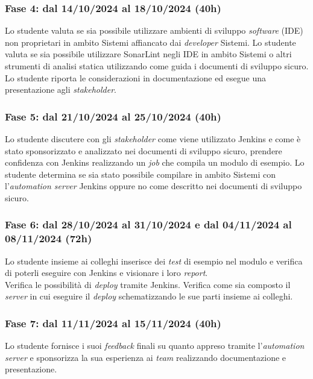 \subsubsection*{Fase 4: dal 14/10/2024 al 18/10/2024 (40h) }
Lo studente valuta se sia possibile utilizzare ambienti di sviluppo \emph{software} (\gls{IDE}) non proprietari in ambito \gls{Sistemi} affiancato dai \emph{developer} \gls{Sistemi}. Lo studente valuta se sia possibile utilizzare SonarLint negli \gls{IDE} in ambito \gls{Sistemi} o altri strumenti di analisi statica utilizzando come guida i documenti di sviluppo sicuro. Lo studente riporta le considerazioni in documentazione ed esegue una presentazione agli \emph{stakeholder}.\\ 

\subsubsection*{Fase 5: dal 21/10/2024 al 25/10/2024 (40h) }
Lo studente discutere con gli \emph{stakeholder} come viene utilizzato Jenkins e come è stato sponsorizzato e analizzato nei documenti di sviluppo sicuro, prendere confidenza con Jenkins realizzando un \emph{job} che compila un modulo di esempio. Lo studente determina se sia stato possibile compilare in ambito \gls{Sistemi} con l'\emph{automation server} Jenkins oppure no come descritto nei documenti di sviluppo sicuro.\\

\subsubsection*{Fase 6: dal 28/10/2024 al 31/10/2024 e dal 04/11/2024 al 08/11/2024 (72h)}
Lo studente insieme ai colleghi inserisce dei \emph{test} di esempio nel modulo e verifica di poterli eseguire con Jenkins e visionare i loro \emph{report}.\\
Verifica le possibilità di \emph{deploy} tramite Jenkins. Verifica come sia composto il \emph{server} in cui eseguire il \emph{deploy} schematizzando le sue parti insieme ai colleghi.\\

\subsubsection*{Fase 7: dal 11/11/2024 al 15/11/2024 (40h) }
Lo studente fornisce i suoi \emph{feedback} finali su quanto appreso tramite l'\emph{automation server} e sponsorizza la sua esperienza ai \emph{team} realizzando documentazione e presentazione.\\

